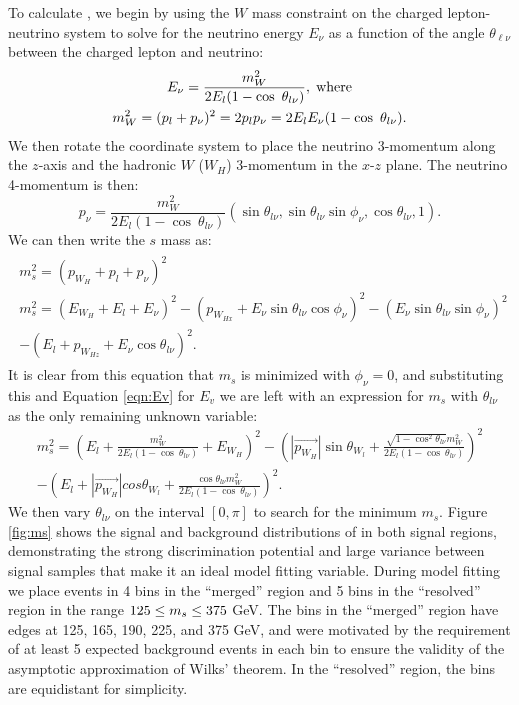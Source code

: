 To calculate \minms, we begin by using the $W$ mass constraint on the charged lepton-neutrino system to solve for the neutrino energy $E_{\nu}$ as a function of the angle $\theta_{\ell\nu}$ between the charged lepton and neutrino:
\begin{equation}
\begin{gathered}
    \label{eqn:Ev}
		E_{\nu} = \frac{m_W^2}{2E_l(1 - \cos\ \theta_{l\nu})},\;{\rm where}\\
		m_W^2 = (p_l + p_{\nu})^2 = 2p_lp_{\nu} = 2E_lE_{\nu}(1 - \cos\ \theta_{l\nu}).
	\end{gathered}
\end{equation}
We then rotate the coordinate system to place the neutrino 3-momentum along the $z$-axis and the hadronic $W$ ($W_H$) 3-momentum in the $x$-$z$ plane. The neutrino 4-momentum is then:
\begin{equation}
	p_{\nu} = \frac{m_W^2}{2E_l(1 - \cos\ \theta_{l\nu})}(\sin \theta_{l\nu}, \sin \theta_{l\nu}\sin \phi_{\nu}, \cos \theta_{l\nu}, 1).
\end{equation}
We can then write the $s$ mass as:
\begin{multline}
\label{eqn:m_s}
	\begin{gathered}
		m_s^2 = (p_{W_H} + p_l + p_{\nu})^2\\
		m_s^2 = (E_{W_H} + E_l + E_{\nu})^2 - (p_{W_{Hx}} + E_{\nu}\sin \theta_{l\nu}\cos \phi_{\nu})^2 - (E_{\nu}\sin \theta_{l\nu}\sin \phi_{\nu})^2 \\- (E_l + p_{W_{Hz}} + E_{\nu}\cos \theta_{l\nu})^2.
	\end{gathered}
\end{multline}
It is clear from this equation that $m_s$ is minimized with $\phi_{\nu} = 0$, and substituting this and Equation \ref{eqn:Ev} for $E_v$ we are left with an expression for $m_s$ with $\theta_{l\nu}$ as the only remaining unknown variable:
\begin{multline}
m_s^2 = \left(E_l + \frac{m_W^2}{2E_l(1 - \cos\ \theta_{l\nu})} + E_{W_H}\right)^2 - \left(|\vec{p_{W_H}}|\sin \theta_{W_l} + \frac{\sqrt{1 - \cos^2 \theta_{l\nu}}m_W^2}{2E_l(1 - \cos\ \theta_{l\nu})}\right)^2 \\- \left(E_l + |\vec{p_{W_H}}|cos \theta_{W_l} + \frac{\cos \theta_{l\nu}m_W^2}{2E_l(1 - \cos\ \theta_{l\nu})}\right)^2.
\end{multline}
We then vary $\theta_{l\nu}$ on the interval $[0,\pi]$ to search for the minimum $m_s$.
Figure \ref{fig:ms} shows the signal and background distributions of \minms in both signal regions, demonstrating the strong discrimination potential and large variance between signal samples that make it an ideal model fitting variable. During model fitting we place events in 4 bins in the ``merged'' region and 5 bins in the ``resolved'' region in the range $125 \leq m_s \leq 375$ GeV. The bins in the ``merged'' region have edges at 125, 165, 190, 225, and 375 GeV, and were motivated by the requirement of at least 5 expected background events in each bin to ensure the validity of the asymptotic approximation of Wilks' theorem. In the ``resolved'' region, the bins are equidistant for simplicity.

